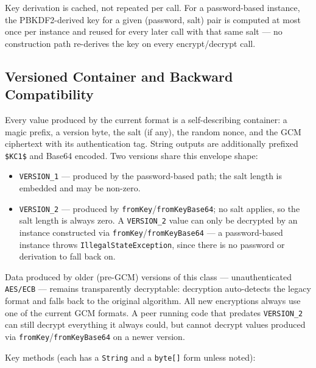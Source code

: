 \begin{notebox}
Key derivation is cached, not repeated per call.  For a password-based instance, the PBKDF2-derived key for a given (password, salt) pair is computed at most once per instance and reused for every later call with that same salt --- no construction path re-derives the key on every encrypt/decrypt call.
\end{notebox}

\subsection{Versioned Container and Backward Compatibility}

Every value produced by the current format is a self-describing container: a magic prefix, a version byte, the salt (if any), the random nonce, and the GCM ciphertext with its authentication tag.  String outputs are additionally prefixed \texttt{\$KC1\$} and Base64 encoded.  Two versions share this envelope shape:

\begin{itemize}
  \item \texttt{VERSION\_1} --- produced by the password-based path; the salt length is embedded and may be non-zero.
  \item \texttt{VERSION\_2} --- produced by \texttt{fromKey}/\texttt{fromKeyBase64}; no salt applies, so the salt length is always zero.  A \texttt{VERSION\_2} value can only be decrypted by an instance constructed via \texttt{fromKey}/\texttt{fromKeyBase64} --- a password-based instance throws \texttt{IllegalStateException}, since there is no password or derivation to fall back on.
\end{itemize}

\noindent
Data produced by older (pre-GCM) versions of this class --- unauthenticated \texttt{AES/ECB} --- remains transparently decryptable: decryption auto-detects the legacy format and falls back to the original algorithm.  All new encryptions always use one of the current GCM formats.  A peer running code that predates \texttt{VERSION\_2} can still decrypt everything it always could, but cannot decrypt values produced via \texttt{fromKey}/\texttt{fromKeyBase64} on a newer version.

\noindent
Key methods (each has a \texttt{String} and a \texttt{byte[]} form unless noted):

